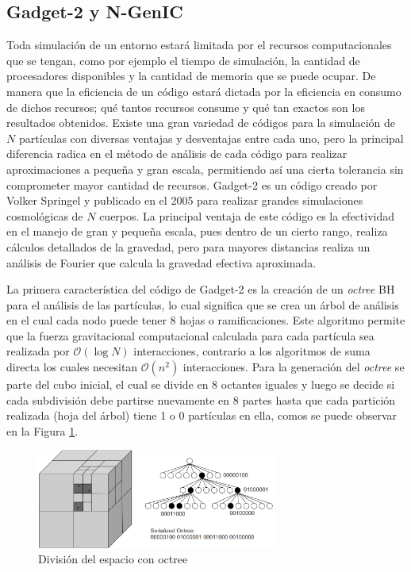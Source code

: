 \subsection{Gadget-2 y N-GenIC}

Toda simulación de un entorno estará limitada por el recursos computacionales que se tengan, como por ejemplo el tiempo de simulación, la cantidad de procesadores disponibles y la cantidad de memoria que se puede ocupar. De manera que la eficiencia de un código estará dictada por la eficiencia en consumo de dichos recursos; qué tantos recursos consume y qué tan exactos son los resultados obtenidos. Existe una gran variedad de códigos para la simulación de $N$ partículas con diversas ventajas y desventajas entre cada uno, pero la principal diferencia radica en el método de análisis de cada código para realizar aproximaciones a pequeña y gran escala, permitiendo así una cierta tolerancia sin comprometer mayor cantidad de recursos. Gadget-2 es un código creado por Volker Springel y publicado en el 2005\cite{gadget} para realizar grandes simulaciones cosmológicas de $N$ cuerpos. La principal ventaja de este código es la efectividad en el manejo de gran y pequeña escala, pues dentro de un cierto rango, realiza cálculos detallados de la gravedad, pero para mayores distancias realiza un análisis de Fourier que calcula la gravedad efectiva aproximada.

La primera característica del código de Gadget-2 es la creación de un \textit{octree} BH para el análisis de las partículas, lo cual significa que se crea un árbol de análisis en el cual cada nodo puede tener 8 hojas o ramificaciones. Este algoritmo permite que la fuerza gravitacional computacional calculada para cada partícula sea realizada por $\mathcal{O}(\log N)$ interacciones, contrario a los algoritmos de suma directa los cuales necesitan $\mathcal{O}(n^{2})$ interacciones. Para la generación del \textit{octree} se parte del cubo inicial, el cual se divide en 8 octantes iguales y luego se decide si cada subdivisión debe partirse nuevamente en 8 partes hasta que cada partición realizada (hoja del árbol) tiene 1 o 0 partículas en ella, comos se puede observar en la Figura \ref{fig:octree}. 

\begin{figure}[H]
	\centering
	\includegraphics[width=0.7\textwidth]{MarcoTeorico/octree_encode}
	\caption[División del espacio con octree]{División del espacio con octree \footnotemark}
	\label{fig:octree}
\end{figure}

